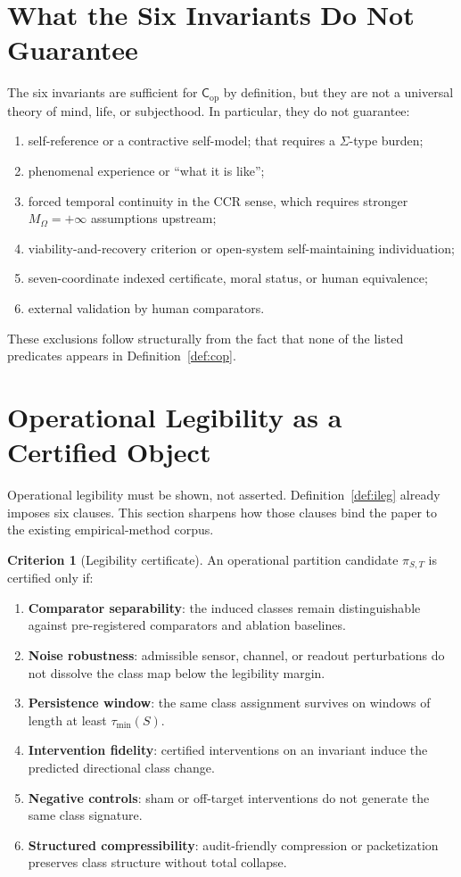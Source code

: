 \documentclass[11pt,a4paper]{article}
\theoremstyle{definition}
\newtheorem{criterion}[theorem]{Criterion}
\newcommand{\Cop}{\mathsf{C}_{\mathrm{op}}}
\begin{document}
\section{What the Six Invariants Do Not Guarantee}
The six invariants are sufficient for $\Cop$ by definition, but they are not a
universal theory of mind, life, or subjecthood. In particular, they do not
guarantee:
\begin{enumerate}[leftmargin=1.5em]
\item self-reference or a contractive self-model; that requires a $\Sigma$-type
burden;
\item phenomenal experience or ``what it is like'';
\item forced temporal continuity in the CCR sense, which requires stronger
$M_\Omega=+\infty$ assumptions upstream;
\item viability-and-recovery criterion or open-system self-maintaining individuation;
\item seven-coordinate indexed certificate, moral status, or human equivalence;
\item external validation by human comparators.
\end{enumerate}
These exclusions follow structurally from the fact that
none of the listed predicates appears in Definition~\ref{def:cop}.

\section{Operational Legibility as a Certified Object}
Operational legibility must be shown, not asserted. Definition~\ref{def:ileg} already imposes six clauses. This section sharpens how those clauses bind the paper to the existing empirical-method corpus.

\begin{criterion}[Legibility certificate]\label{crit:legibility}
An operational partition candidate $\pi_{S,T}$ is certified only if:
\begin{enumerate}[leftmargin=1.5em]
\item \textbf{Comparator separability}: the induced classes remain distinguishable against pre-registered comparators and ablation baselines.
\item \textbf{Noise robustness}: admissible sensor, channel, or readout perturbations do not dissolve the class map below the legibility margin.
\item \textbf{Persistence window}: the same class assignment survives on windows of length at least $\tau_{\min}(S)$.
\item \textbf{Intervention fidelity}: certified interventions on an invariant induce the predicted directional class change.
\item \textbf{Negative controls}: sham or off-target interventions do not generate the same class signature.
\item \textbf{Structured compressibility}: audit-friendly compression or packetization preserves class structure without total collapse.
\end{enumerate}
\end{criterion}
\end{document}
